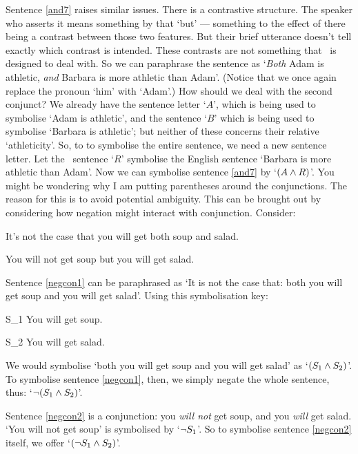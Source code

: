 Sentence \ref{and7} raises similar issues. There is a contrastive structure.  The speaker who asserts it means something by that ‘but’ — something to the effect of there being a contrast between those two features. But their brief utterance doesn’t tell exactly which contrast is intended. These contrasts are not something that \TFL\ is designed to deal with. So we can paraphrase the sentence as `\emph{Both} Adam is athletic, \emph{and} Barbara is more athletic than Adam'. (Notice that we once again replace the pronoun `him' with `Adam'.) How should we deal with the second conjunct? We already have the sentence letter `$A$', which is being used to symbolise `Adam is athletic', and the sentence `$B$' which is being used to symbolise `Barbara is athletic'; but neither of these concerns their relative `athleticity'. So, to to symbolise the entire sentence, we need a new sentence letter. Let the \TFL\ sentence `$R$' symbolise the English sentence `Barbara is more athletic than Adam'. Now we can symbolise sentence \ref{and7} by `$(A \wedge R)$'.
You might be wondering why I am putting parentheses around the conjunctions. The reason for this is to avoid potential ambiguity.\label{p.con.ambig} This can be brought out by considering how negation might interact with conjunction. Consider:
	\begin{earg}
		\item[\ex{negcon1}] It's not the case that you will get both soup and salad.
		\item[\ex{negcon2}] You will not get soup but you will get salad.
	\end{earg}
Sentence \ref{negcon1} can be paraphrased as `It is not the case that: both you will get soup and you will get salad'. Using this symbolisation key:
	\begin{ekey}
		\item[S_1] You will get soup.
		\item[S_2] You will get salad.
	\end{ekey}
We would symbolise `both you will get soup and you will get salad' as `$(S_{1} \wedge S_{2})$'. To symbolise sentence \ref{negcon1}, then, we simply negate the whole sentence, thus: `$\neg (S_{1} \wedge S_{2})$'. 

Sentence \ref{negcon2} is a conjunction: you \emph{will not} get soup, and you \emph{will} get salad. `You will not get soup' is symbolised by `$\neg S_{1}$'. So to symbolise sentence \ref{negcon2} itself, we offer `$(\neg S_{1} \wedge S_{2})$'. 

